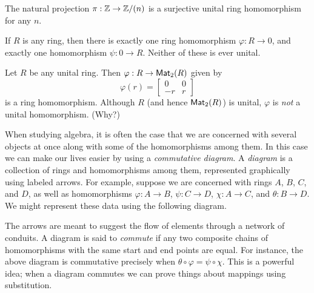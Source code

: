 \begin{examples}
\item The natural projection \(\pi : \mathbb{Z} \rightarrow \mathbb{Z}/(n)\) is a surjective unital ring homomorphism for any \(n\).

\item If \(R\) is any ring, then there is exactly one ring homomorphism \(\varphi : R \rightarrow 0\), and exactly one homomorphism \(\psi : 0 \rightarrow R\).
Neither of these is ever unital.

\item Let \(R\) be any unital ring.
Then \(\varphi : R \rightarrow \mathsf{Mat}_{2}(R)\) given by \[ \varphi(r) = \begin{bmatrix} 0 & 0 \\ -r & r \end{bmatrix} \] is a ring homomorphism.
Although \(R\) (and hence \(\mathsf{Mat}_{2}(R)\)) is unital, \(\varphi\) is \emph{not} a unital homomorphism.
(Why?)
\end{examples}

When studying algebra, it is often the case that we are concerned with several objects at once along with some of the homomorphisms among them.
In this case we can make our lives easier by using a \emph{commutative diagram}.
A \emph{diagram} is a collection of rings and homomorphisms among them, represented graphically using labeled arrows.
For example, suppose we are concerned with rings \(A\), \(B\), \(C\), and \(D\), as well as homomorphisms \(\varphi : A \rightarrow B\), \(\psi : C \rightarrow D\), \(\chi : A \rightarrow C\), and \(\theta : B \rightarrow D\).
We might represent these data using the following diagram.
\begin{center}
\end{center}
The arrows are meant to suggest the flow of elements through a network of conduits.
A diagram is said to \emph{commute} if any two composite chains of homomorphisms with the same start and end points are equal.
For instance, the above diagram is commutative precisely when \(\theta \circ \varphi = \psi \circ \chi\).
This is a powerful idea; when a diagram commutes we can prove things about mappings using substitution.

